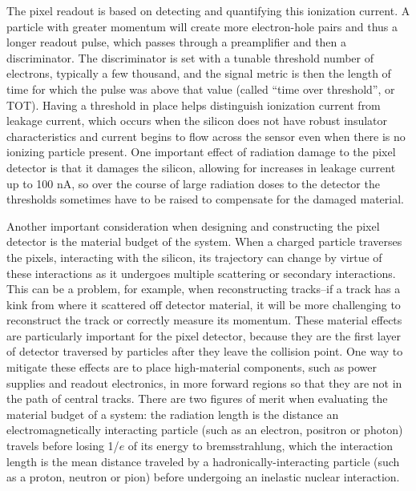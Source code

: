 The pixel readout is based on detecting and quantifying this ionization current.  A particle with greater momentum will create more electron-hole pairs and thus a longer readout pulse, which passes through a preamplifier and then a discriminator.  The discriminator is set with a tunable threshold number of electrons, typically a few thousand, and the signal metric is then the length of time for which the pulse was above that value (called ``time over threshold'', or TOT).  Having a threshold in place helps distinguish ionization current from leakage current, which occurs when the silicon does not have robust insulator characteristics and current begins to flow across the sensor even when there is no ionizing particle present.  One important effect of radiation damage to the pixel detector is that it damages the silicon, allowing for increases in leakage current up to 100 nA, so over the course of large radiation doses to the detector the thresholds sometimes have to be raised to compensate for the damaged material.  

Another important consideration when designing and constructing the pixel detector is the material budget of the system.  When a charged particle traverses the pixels, interacting with the silicon, its trajectory can change by virtue of these interactions as it undergoes multiple scattering or secondary interactions.  This can be a problem, for example, when reconstructing tracks--if a track has a kink from where it scattered off detector material, it will be more challenging to reconstruct the track or correctly measure its momentum.  These material effects are particularly important for the pixel detector, because they are the first layer of detector traversed by particles after they leave the collision point.  One way to mitigate these effects are to place high-material components, such as power supplies and readout electronics, in more forward regions so that they are not in the path of central tracks.  There are two figures of merit when evaluating the material budget of a system: the radiation length is the distance an electromagnetically interacting particle (such as an electron, positron or photon) travels before losing 1/$e$ of its energy to bremsstrahlung, which the interaction length is the mean distance traveled by a hadronically-interacting particle (such as a proton, neutron or pion) before undergoing an inelastic nuclear interaction.

